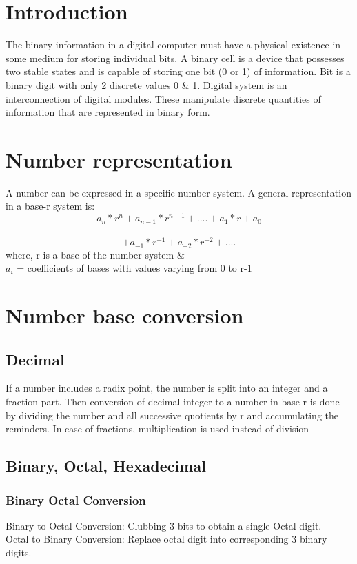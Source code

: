 \section{Introduction}
The binary information in a digital computer must have a physical existence in some medium for storing individual bits. A binary cell is a device that possesses two stable states and is capable of storing one bit (0 or 1) of information. Bit is a binary digit with only 2 discrete values 0 \& 1. Digital system is an interconnection of digital modules. These manipulate discrete quantities of information that are represented in binary form.

\section{Number representation}
A number can be expressed in a specific number system. A general representation in a base-r system is:\\
\[ a_n*r^n + a_{n-1}*r^{n-1} + .... + a_1*r + a_0\]\
\[+ a_{-1}*r^{-1} + a_{-2}*r^{-2} + ....\]
where, r is a base of the number system \& \\
\(a_{i}\) = coefficients of bases with values varying from 0 to r-1 

\section{Number base conversion}
\subsection{Decimal}
If a number includes a radix point, the number is split into an integer and a fraction part. Then conversion of decimal integer to a number in base-r is done by dividing the number and all successive quotients by r and accumulating the reminders. In case of fractions, multiplication is used instead of division 

\subsection{Binary, Octal, Hexadecimal} 
\subsubsection{Binary Octal Conversion}
Binary to Octal Conversion:  Clubbing 3 bits to obtain a single Octal digit.\\
Octal to Binary Conversion:  Replace octal digit into corresponding 3 binary digits.

